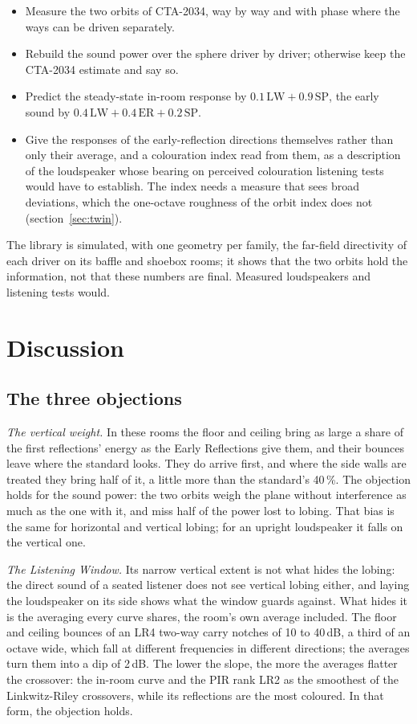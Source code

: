 \documentclass[11pt,a4paper]{article}
\begin{document}
\begin{itemize}
\item Measure the two orbits of CTA-2034, way by way and with phase where the ways can be driven
separately.
\item Rebuild the sound power over the sphere driver by driver; otherwise keep the CTA-2034 estimate and
say so.
\item Predict the steady-state in-room response by $0.1\,\mathrm{LW} + 0.9\,\mathrm{SP}$, the early sound by
$0.4\,\mathrm{LW} + 0.4\,\mathrm{ER} + 0.2\,\mathrm{SP}$.
\item Give the responses of the early-reflection directions themselves rather than only their average,
and a colouration index read from them, as a description of the loudspeaker whose bearing on perceived
colouration listening tests would have to establish. The index needs a measure that sees broad
deviations, which the one-octave roughness of the orbit index does not (section~\ref{sec:twin}).
\end{itemize}
The library is simulated, with one geometry per family, the far-field directivity of each driver on
its baffle and shoebox rooms; it shows that the two orbits hold the information, not that these
numbers are final. Measured loudspeakers and listening tests would.

\section{Discussion}

\subsection{The three objections}

\emph{The vertical weight.} In these rooms the floor and ceiling bring as large a share of the first
reflections' energy as the Early Reflections give them, and their bounces leave where the standard
looks. They do arrive first, and where the side walls are treated they bring half of it, a little
more than the standard's 40\,\%. The objection holds for the sound power: the two orbits weigh the
plane without interference as much as the one with it, and miss half of the power lost to lobing. That
bias is the same for horizontal and vertical lobing; for an upright loudspeaker it falls on the
vertical one.

\emph{The Listening Window.} Its narrow vertical extent is not what hides the lobing: the direct sound
of a seated listener does not see vertical lobing either, and laying the loudspeaker on its side shows
what the window guards against. What hides it is the averaging every curve shares, the room's own
average included. The floor and ceiling bounces of an LR4 two-way carry notches of 10 to 40\,dB, a third
of an octave wide, which fall at different frequencies in different directions; the averages turn them
into a dip of 2\,dB. The lower the slope, the more the averages flatter the crossover: the in-room curve
and the PIR rank LR2 as the smoothest of the Linkwitz-Riley crossovers, while its reflections are the
most coloured. In that form, the objection holds.
\end{document}
